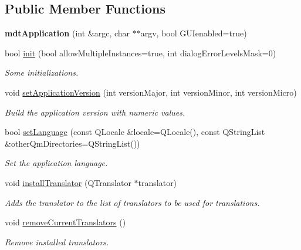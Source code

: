 \subsection*{Public Member Functions}
\begin{DoxyCompactItemize}
\item 
\hypertarget{classmdt_application_ab6268414770ee9239c83677c15a67f75}{
{\bfseries mdtApplication} (int \&argc, char $\ast$$\ast$argv, bool GUIenabled=true)}
\label{classmdt_application_ab6268414770ee9239c83677c15a67f75}

\item 
bool \hyperlink{classmdt_application_a5e91676cfeaf0d2e3e10ff58f1da6f0c}{init} (bool allowMultipleInstances=true, int dialogErrorLevelsMask=0)
\begin{DoxyCompactList}\small\item\em Some initializations. \end{DoxyCompactList}\item 
void \hyperlink{classmdt_application_a79dbb5f3d889d7cd9b8909a4eb8bcce1}{setApplicationVersion} (int versionMajor, int versionMinor, int versionMicro)
\begin{DoxyCompactList}\small\item\em Build the application version with numeric values. \end{DoxyCompactList}\item 
bool \hyperlink{classmdt_application_a01355ee29c2824e905cad49a34dcf0aa}{setLanguage} (const QLocale \&locale=QLocale(), const QStringList \&otherQmDirectories=QStringList())
\begin{DoxyCompactList}\small\item\em Set the application language. \end{DoxyCompactList}\item 
void \hyperlink{classmdt_application_af4ff7f4cbb1c93a35f06ea197e3dde42}{installTranslator} (QTranslator $\ast$translator)
\begin{DoxyCompactList}\small\item\em Adds the translator to the list of translators to be used for translations. \end{DoxyCompactList}\item 
void \hyperlink{classmdt_application_ae83acc410a132b9972d6e961e0c79b0d}{removeCurrentTranslators} ()
\begin{DoxyCompactList}\small\item\em Remove installed translators. \end{DoxyCompactList}\end{DoxyCompactItemize}
